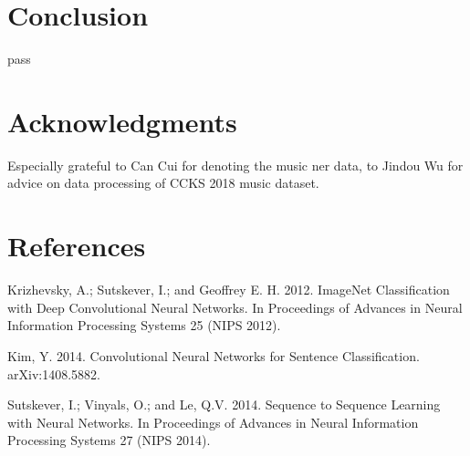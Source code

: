 \documentclass[letterpaper]{article} %
\begin{document}
\begin{table}[t]
\caption{Main Results}\smallskip
\centering
{}
\label{table3}
\end{table}

\section{Conclusion}

pass

\section{ Acknowledgments}
Especially grateful to Can Cui for denoting the music ner data, to Jindou Wu for advice on data processing of CCKS 2018 music dataset.

\section{References}

\smallskip \noindent
Krizhevsky, A.; Sutskever, I.; and Geoffrey E. H. 2012. ImageNet Classification with Deep Convolutional Neural Networks. In Proceedings of  Advances in Neural Information Processing Systems 25 (NIPS 2012).

\smallskip \noindent
Kim, Y. 2014. Convolutional Neural Networks for Sentence Classification. arXiv:1408.5882.

\smallskip \noindent
Sutskever, I.; Vinyals, O.; and Le, Q.V. 2014. Sequence to Sequence Learning with Neural Networks. In Proceedings of Advances in Neural Information Processing Systems 27 (NIPS 2014).
\end{document}
